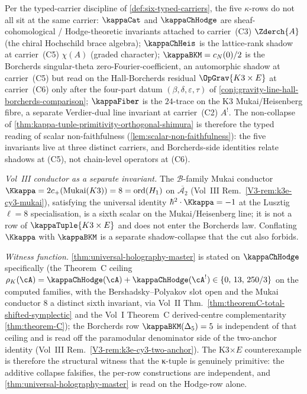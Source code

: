 \begin{remark}
Per the typed-carrier discipline of
\cref{def:six-typed-carriers}, the five $\kappa$-rows do not all
sit at the same carrier: $\kappaCat$ and $\kappaChHodge$ are
sheaf-cohomological / Hodge-theoretic invariants attached to
carrier~\textup{(C3)} $\Zderch{A}$ (the chiral Hochschild brace
algebra); $\kappaChHeis$ is the lattice-rank shadow at
carrier~\textup{(C5)} $\chi(A)$ \textup(graded character\textup);
$\kappaBKM = c_{N}(0)/2$ is the Borcherds singular-theta
zero-Fourier-coefficient, an automorphic shadow at
carrier~\textup{(C5)} but read on the Hall-Borcherds residual
$\OpGrav{K3 \times E}$ at carrier~\textup{(C6)} only after the
four-part datum $(\beta, \delta, \varepsilon, \tau)$ of
\cref{conj:gravity-line-hall-borcherds-comparison}; $\kappaFiber$
is the $24$-trace on the K3 Mukai/Heisenberg fibre, a separate
Verdier-dual line invariant at carrier~\textup{(C2)} $A^{!}$. The
non-collapse of \cref{thm:kappa-tuple-primitivity-orthogonal-shimura}
is therefore the typed reading of scalar non-faithfulness
(\cref{lem:scalar-non-faithfulness}): the five invariants live at
three distinct carriers, and Borcherds-side identities relate
shadows at (C5), not chain-level operators at (C6).

\emph{Vol~III conductor as a separate invariant.} The
$\mathcal B$-family Mukai conductor
$\Kkappa = 2 c_+(\mathrm{Mukai}(K3)) = 8 = \mathrm{ord}(H_1)$ on
$\overline{\mathcal A_2}$ (Vol~III Rem.~\ref*{V3-rem:k3e-cy3-mukai}),
satisfying the universal identity
$\hbar^2 \cdot \Kkappa = -1$ at the Lusztig $\ell = 8$
specialisation, is a sixth scalar on the Mukai/Heisenberg line; it
is not a row of $\kappaTuple{K3 \times E}$ and does not enter the
Borcherds law. Conflating $\Kkappa$ with $\kappaBKM$ is a separate
shadow-collapse that the cut also forbids.

\emph{Witness function.} \cref{thm:universal-holography-master}
is stated on $\kappaChHodge$ specifically (the Theorem~C ceiling
$\rho_K(\cA) = \kappaChHodge(\cA) + \kappaChHodge(\cA^!) \in
\{0,\, 13,\, 250/3\}$ on the computed families, with the
Bershadsky--Polyakov slot open and the Mukai conductor $8$ a
distinct sixth invariant, via Vol~II
Thm.~\ref*{thm:theoremC-total-shifted-symplectic} and the Vol~I
Theorem~C derived-centre complementarity
\ref*{thm:theorem-C}); the Borcherds row $\kappaBKM(\Delta_5) = 5$
is independent of that ceiling and is read off the paramodular
denominator side of the two-anchor identity
(Vol~III Rem.~\ref*{V3-rem:k3e-cy3-two-anchor}).
The K3$\times E$ counterexample is therefore the structural
witness that the κ-tuple is genuinely primitive: the additive
collapse falsifies, the per-row constructions are independent,
and \cref{thm:universal-holography-master} is read on the
Hodge-row alone.
\end{remark}

